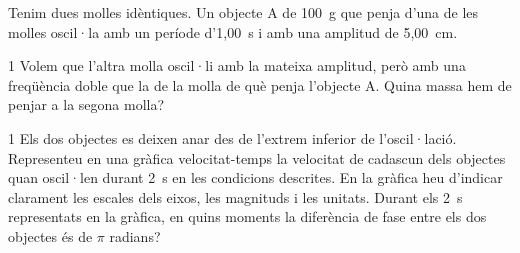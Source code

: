 Tenim dues molles idèntiques. Un objecte A de 100~g que penja d'una de les molles oscil·la amb un període d'1,00~s i amb una amplitud de 5,00~cm.

\begin{apartat}{1}
Volem que l'altra molla oscil·li amb la mateixa amplitud, però amb una freqüència doble que la de la molla de què penja l'objecte A. Quina massa hem de penjar a la segona molla?
\end{apartat}

\begin{apartat}{1}
Els dos objectes es deixen anar des de l'extrem inferior de l'oscil·lació. Representeu en una gràfica velocitat-temps la velocitat de cadascun dels objectes quan oscil·len durant 2~s en les condicions descrites. En la gràfica heu d'indicar clarament les escales dels eixos, les magnituds i les unitats. Durant els 2~s representats en la gràfica, en quins moments la diferència de fase entre els dos objectes és de $\pi$ radians?
\end{apartat}
